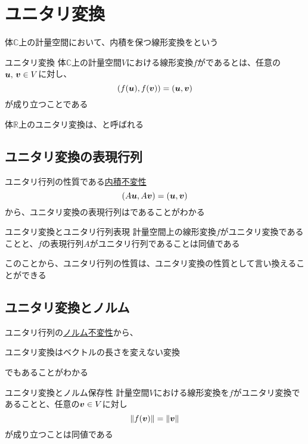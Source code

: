 \documentclass[../../../topic_linear-algebra]{subfiles}
\begin{document}
\sectionline
\section{ユニタリ変換}

体$\mathbb{C}$上の計量空間において、内積を保つ線形変換をという

\begin{definition}{ユニタリ変換}
  体$\mathbb{C}$上の計量空間$V$における線形変換$f$がであるとは、任意の$\vb*{u},\,\vb*{v} \in V$に対し、
  \begin{equation*}
    (f(\vb*{u}),f(\vb*{v})) = (\vb*{u},\vb*{v})
  \end{equation*}
  が成り立つことである
\end{definition}

体$\mathbb{R}$上のユニタリ変換は、と呼ばれる

\subsection{ユニタリ変換の表現行列}

ユニタリ行列の性質である\hyperref[thm:unitary-characterized-by-inner-product-invariance]{内積不変性}
\begin{equation*}
  (A\vb*{u}, A\vb*{v}) = (\vb*{u}, \vb*{v})
\end{equation*}
から、ユニタリ変換の表現行列はであることがわかる

\begin{theorem*}{ユニタリ変換とユニタリ行列表現}
  計量空間上の線形変換$f$がユニタリ変換であることと、$f$の表現行列$A$がユニタリ行列であることは同値である
\end{theorem*}

このことから、ユニタリ行列の性質は、ユニタリ変換の性質として言い換えることができる

\subsection{ユニタリ変換とノルム}

ユニタリ行列の\hyperref[thm:unitary-characterized-by-norm-invariance]{ノルム不変性}から、
\begin{shaded}
  ユニタリ変換はベクトルの長さを変えない変換
\end{shaded}
でもあることがわかる

\begin{theorem*}{ユニタリ変換とノルム保存性}
  計量空間$V$における線形変換を$f$がユニタリ変換であることと、任意の$\vb*{v} \in V$に対し
  \begin{equation*}
    \|f(\vb*{v})\| = \|\vb*{v}\|
  \end{equation*}
  が成り立つことは同値である
\end{theorem*}
\end{document}
